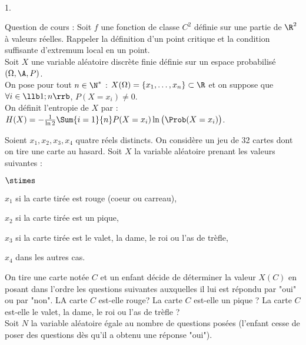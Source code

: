 \documentclass[11pt]{article}%
\begin{document}



\begin{exerciceAP}~
  \begin{noliste}{1.}
    \setlength{\itemsep}{2mm}
  \item Question de cours : Soit $f$ une fonction de classe $C^2$
    définie sur une partie de $\R^2$ à valeurs réelles. Rappeler la
    définition d'un point critique et la condition suffisante
    d'extremum local en un point.\\

    Soit $X$ une variable aléatoire discrète finie définie sur un
    espace probabilisé $(\Omega , \A , P)$.\\
    On pose pour tout $n \in \N^*$ : $X ( \Omega ) = \{ x_1 , \dots ,
    x_n \} \subset \R$ et on suppose que $\forall i \in \llb 1 ; n
    \rrb$, $P (X=x_i) \neq 0$.\\

    On définit l'entropie de $X$ par : $ H(X) = - \frac{ 1 }{ \ln 2 }
    \Sum{i=1}{n} P (X=x_i) \ln \big( \Prob(X=x_i) \big)$.

  \item Soient $x_1 , x_2 , x_3 , x_4$ quatre réels distincts. On
    considère un jeu de 32 cartes dont on tire une carte au
    hasard. Soit $X$ la variable aléatoire prenant les valeurs
    suivantes : 
    \begin{noliste}{$\stimes$}
    \item $x_1$ si la carte tirée est rouge (coeur ou carreau),
    \item $x_2$ si la carte tirée est un pique,
    \item $x_3$ si la carte tirée est le valet, la dame, le roi ou
      l'as de trèfle,
    \item $x_4$ dans les autres cas.
    \end{noliste}

    On tire une carte notée $C$ et un enfant décide de déterminer la
    valeur $X(C)$ en posant dans l'ordre les questions suivantes
    auxquelles il lui est répondu par "oui" ou par "non". LA carte $C$
    est-elle rouge? La carte $C$ est-elle un pique ? La carte $C$
    est-elle le valet, la dame, le roi ou l'as de trèfle ? \\
    Soit $N$ la variable aléatoire égale au nombre de questions posées
    (l'enfant cesse de poser des questions dès qu'il a obtenu une
    réponse "oui"). 


\end{noliste}
\end{exerciceAP}
\end{document}

